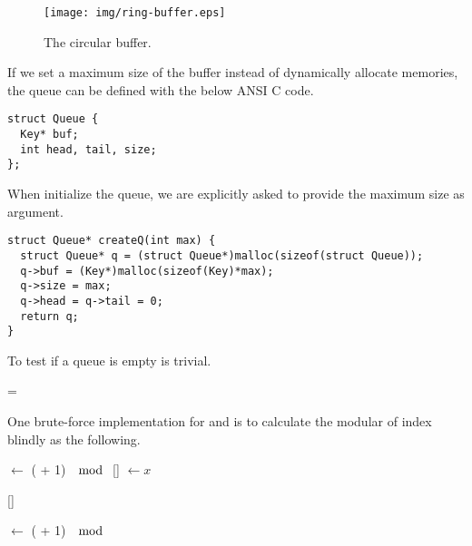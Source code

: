 \documentclass{article}
\begin{document}
\begin{figure}[htbp]
 \centering
 \texttt{[image: img/ring-buffer.eps]}
 \caption{The circular buffer.} \label{fig:circular-buffer}
\end{figure}

If we set a maximum size of the buffer instead of dynamically allocate
memories, the queue can be defined with the below ANSI C code.

\lstset{language=C}
\begin{lstlisting}
struct Queue {
  Key* buf;
  int head, tail, size;
};
\end{lstlisting}

When initialize the queue, we are explicitly asked to provide the maximum
size as argument.

\begin{lstlisting}
struct Queue* createQ(int max) {
  struct Queue* q = (struct Queue*)malloc(sizeof(struct Queue));
  q->buf = (Key*)malloc(sizeof(Key)*max);
  q->size = max;
  q->head = q->tail = 0;
  return q;
}
\end{lstlisting}

To test if a queue is empty is trivial.

\begin{algorithmic}
  \State \Return {} = 
\EndFunction
\end{algorithmic}

One brute-force implementation for  and 
is to calculate the modular of index blindly as the following.

\begin{algorithmic}
    \State {} $\gets $ ( + 1) $\mod$ 
    \State {}[] $\gets x$
  \EndIf
\EndFunction
\end{algorithmic}

\begin{algorithmic}
    \State \Return {}[]
  \EndIf
\EndFunction
\end{algorithmic}

\begin{algorithmic}
    \State {} $\gets $ ( + 1) $\mod$ 
  \EndIf
\EndFunction
\end{algorithmic}
\end{document}
